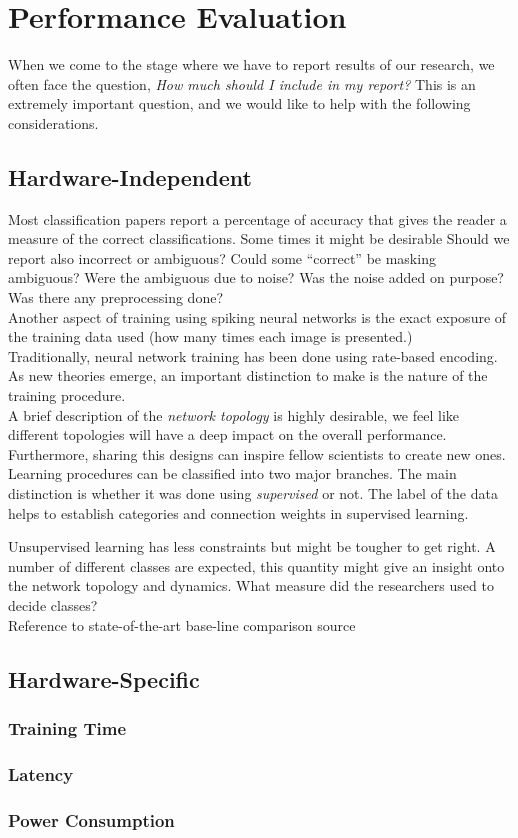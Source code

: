 \section{Performance Evaluation}
\label{sec:eval}

When we come to the stage where we have to report results of our research, we often face the question, \emph{How much should I include in my report?} This is an extremely important question, and we would like to help with the following considerations.

\subsection{Hardware-Independent}
Most classification papers report a percentage of accuracy that gives the reader a measure of the correct classifications. Some times it might be desirable  Should we report also incorrect or ambiguous? Could some ``correct'' be masking ambiguous? Were the ambiguous due to noise? Was the noise added on purpose? Was there any preprocessing done?\\

Another aspect of training using spiking neural networks is the exact exposure of the training data used (how many times each image is presented.)\\

Traditionally, neural network training has been done using rate-based encoding. As new theories emerge, an important distinction to make is the nature of the  training procedure.\\

A brief description of the \emph{network topology} is highly desirable, we feel like different topologies will have a deep impact on the overall performance. Furthermore, sharing this designs can inspire fellow scientists to create new ones. \\

Learning procedures can be classified into two major branches. The main distinction is whether it was done using \emph{supervised} or not. The label of the data helps to establish categories and connection weights in supervised learning. 

Unsupervised learning has less constraints but might be tougher to get right. A number of different classes are expected, this quantity might give an insight onto the network topology and dynamics. What measure did the researchers used to decide classes?\\

Reference to state-of-the-art base-line comparison source

\subsection{Hardware-Specific}
	\subsubsection{Training Time}
	\subsubsection{Latency}
	\subsubsection{Power Consumption}
	
